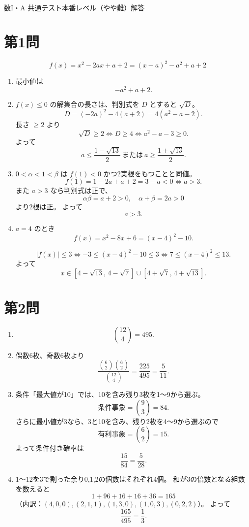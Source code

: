 \documentclass[a4paper,12pt]{jsarticle}
\begin{document}
\begin{center}
{\LARGE 数I・A 共通テスト本番レベル（やや難）解答}
\end{center}

\vspace{1em}

\section*{第1問}
\[
f(x)=x^2-2ax+a+2=(x-a)^2-a^2+a+2
\]
\begin{enumerate}[label=\arabic*.]
  \item 最小値は
  \[
  -a^2+a+2.
  \]
  \item $f(x)\le0$ の解集合の長さは、判別式を $D$ とすると $\sqrt{D}$。
  \[
  D=(-2a)^2-4(a+2)=4(a^2-a-2).
  \]
  長さ $\ge2$ より
  \[
  \sqrt{D}\ge2 \iff D\ge4
  \iff a^2-a-3\ge0.
  \]
  よって
  \[
  a\le\frac{1-\sqrt{13}}{2}\ \text{または}\ a\ge\frac{1+\sqrt{13}}{2}.
  \]
  \item $0<\alpha<1<\beta$ は $f(1)<0$ かつ2実根をもつことと同値。
  \[
  f(1)=1-2a+a+2=3-a<0 \iff a>3.
  \]
  また $a>3$ なら判別式は正で、
  \[
  \alpha\beta=a+2>0,\quad \alpha+\beta=2a>0
  \]
  より2根は正。
  よって
  \[
  a>3.
  \]
  \item $a=4$ のとき
  \[
  f(x)=x^2-8x+6=(x-4)^2-10.
  \]
  
  \[
  |f(x)|\le3
  \iff -3\le (x-4)^2-10\le3
  \iff 7\le (x-4)^2\le13.
  \]
  よって
  \[
  x\in[4-\sqrt{13},\,4-\sqrt7]\cup[4+\sqrt7,\,4+\sqrt{13}].
  \]
\end{enumerate}

\section*{第2問}
\begin{enumerate}[label=\arabic*.]
  \item
  \[
  \binom{12}{4}=495.
  \]
  \item 偶数6枚、奇数6枚より
  \[
  \frac{\binom62\binom62}{\binom{12}4}
  =\frac{225}{495}=\frac{5}{11}.
  \]
  \item 条件「最大値が10」では、10を含み残り3枚を1～9から選ぶ。
  \[
  \text{条件事象}=\binom93=84.
  \]
  さらに最小値が3なら、3と10を含み、残り2枚を4～9から選ぶので
  \[
  \text{有利事象}=\binom62=15.
  \]
  よって条件付き確率は
  \[
  \frac{15}{84}=\frac{5}{28}.
  \]
  \item 1～12を3で割った余り0,1,2の個数はそれぞれ4個。
  和が3の倍数となる組数を数えると
  \[
  1+96+16+16+36=165
  \]
  （内訳：$(4,0,0),(2,1,1),(1,3,0),(1,0,3),(0,2,2)$）。
  よって
  \[
  \frac{165}{495}=\frac13.
  \]
\end{enumerate}
\end{document}
